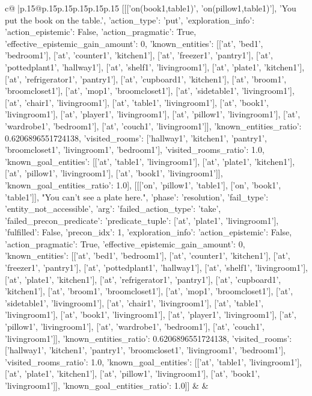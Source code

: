 \documentclass{article}
\begin{document}
{\begin{supertabular}{c@{$\;$}|p{.15\linewidth}@{}p{.15\linewidth}p{.15\linewidth}p{.15\linewidth}p{.15\linewidth}p{.15\linewidth}}
{{{	 [[['on(book1,table1)', 'on(pillow1,table1)'], 'You put the book on the table.', {'action_type': 'put', 'exploration_info': {'action_epistemic': False, 'action_pragmatic': True, 'effective_epistemic_gain_amount': 0, 'known_entities': [['at', 'bed1', 'bedroom1'], ['at', 'counter1', 'kitchen1'], ['at', 'freezer1', 'pantry1'], ['at', 'pottedplant1', 'hallway1'], ['at', 'shelf1', 'livingroom1'], ['at', 'plate1', 'kitchen1'], ['at', 'refrigerator1', 'pantry1'], ['at', 'cupboard1', 'kitchen1'], ['at', 'broom1', 'broomcloset1'], ['at', 'mop1', 'broomcloset1'], ['at', 'sidetable1', 'livingroom1'], ['at', 'chair1', 'livingroom1'], ['at', 'table1', 'livingroom1'], ['at', 'book1', 'livingroom1'], ['at', 'player1', 'livingroom1'], ['at', 'pillow1', 'livingroom1'], ['at', 'wardrobe1', 'bedroom1'], ['at', 'couch1', 'livingroom1']], 'known_entities_ratio': 0.6206896551724138, 'visited_rooms': ['hallway1', 'kitchen1', 'pantry1', 'broomcloset1', 'livingroom1', 'bedroom1'], 'visited_rooms_ratio': 1.0, 'known_goal_entities': [['at', 'table1', 'livingroom1'], ['at', 'plate1', 'kitchen1'], ['at', 'pillow1', 'livingroom1'], ['at', 'book1', 'livingroom1']], 'known_goal_entities_ratio': 1.0}}], [[['on', 'pillow1', 'table1'], ['on', 'book1', 'table1']], "You can't see a plate here.", {'phase': 'resolution', 'fail_type': 'entity_not_accessible', 'arg': {'failed_action_type': 'take', 'failed_precon_predicate': {'predicate_tuple': ['at', 'plate1', 'livingroom1'], 'fulfilled': False, 'precon_idx': 1}}, 'exploration_info': {'action_epistemic': False, 'action_pragmatic': True, 'effective_epistemic_gain_amount': 0, 'known_entities': [['at', 'bed1', 'bedroom1'], ['at', 'counter1', 'kitchen1'], ['at', 'freezer1', 'pantry1'], ['at', 'pottedplant1', 'hallway1'], ['at', 'shelf1', 'livingroom1'], ['at', 'plate1', 'kitchen1'], ['at', 'refrigerator1', 'pantry1'], ['at', 'cupboard1', 'kitchen1'], ['at', 'broom1', 'broomcloset1'], ['at', 'mop1', 'broomcloset1'], ['at', 'sidetable1', 'livingroom1'], ['at', 'chair1', 'livingroom1'], ['at', 'table1', 'livingroom1'], ['at', 'book1', 'livingroom1'], ['at', 'player1', 'livingroom1'], ['at', 'pillow1', 'livingroom1'], ['at', 'wardrobe1', 'bedroom1'], ['at', 'couch1', 'livingroom1']], 'known_entities_ratio': 0.6206896551724138, 'visited_rooms': ['hallway1', 'kitchen1', 'pantry1', 'broomcloset1', 'livingroom1', 'bedroom1'], 'visited_rooms_ratio': 1.0, 'known_goal_entities': [['at', 'table1', 'livingroom1'], ['at', 'plate1', 'kitchen1'], ['at', 'pillow1', 'livingroom1'], ['at', 'book1', 'livingroom1']], 'known_goal_entities_ratio': 1.0}}]] 
	  } 
	   } 
	   } 
	 & & \\ 
 


\end{supertabular}}
\end{document}
